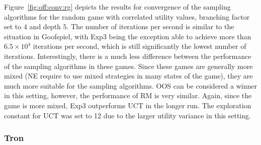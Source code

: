 Figure~\ref{fig:off:conv:rg} depicts the results for convergence of the sampling algorithms for the random game with correlated utility values, branching factor set to $4$ and depth $5$.
The number of iterations per second is similar to the situation in Goofspiel, with Exp3 being the exception able to achieve more than $6.5\times10^4$ iterations per second, which is still significantly the lowest number of iterations.
Interestingly, there is a much less difference between the performance of the sampling algorithms in these games.
Since these games are generally more mixed (\ie NE require to use mixed strategies in many states of the game), they are much more suitable for the sampling algorithms.
OOS can be considered a winner in this setting, however, the performance of RM is very similar.
Again, since the game is more mixed, Exp3 outperforms UCT in the longer run.
The exploration constant for UCT was set to 12 due to the larger utility variance in this setting.

\subsubsection{Tron}

